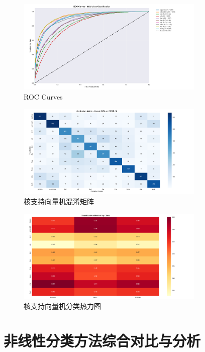 \documentclass[UTF8]{report}
\theoremstyle{MyLineTheoremStyle} %
\theoremstyle{MyBlockTheoremStyle} %
\theoremstyle{MySubsubsectionStyle} %
\begin{document}
\begin{figure}[H]
    \centering
    \includegraphics[width=0.8\textwidth]{svm_roc_c.png}
    \caption{ROC Curves}
    \label{fig:svm_ROC_Curves}
\end{figure}

\begin{figure}[H]
    \centering
    \includegraphics[width=0.8\textwidth]{svm_cm.png}
    \caption{核支持向量机混淆矩阵}
    \label{fig:svm_confusion_matrix}
\end{figure}

\begin{figure}[H]
    \centering
    \includegraphics[width=0.8\textwidth]{svm_cm-c.png}
    \caption{核支持向量机分类热力图}
    \label{fig:svm_classification_metrics}
\end{figure}

\section{非线性分类方法综合对比与分析}
\end{document}
